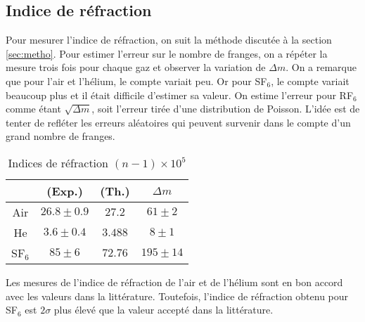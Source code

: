\documentclass[10pt,letterpaper,twocolumn]{article}
\newcommand{\s}{\hspace{0.1cm}}
\begin{document}
\subsection{Indice de réfraction}
Pour mesurer l'indice de réfraction, on suit la méthode discutée à la section \ref{sec:metho}. Pour estimer l'erreur sur le nombre de franges, on a répéter la mesure trois fois pour chaque gaz et observer la variation de $\Delta m$. On a remarque que pour l'air et l'hélium, le compte variait peu. Or pour SF$_6$, le compte variait beaucoup plus et il était difficile d'estimer sa valeur. On estime l'erreur pour RF$_6$ comme étant $\sqrt{\Delta m}$, soit l'erreur tirée d'une distribution de Poisson. L'idée est de tenter de refléter les erreurs aléatoires qui peuvent survenir dans le compte d'un grand nombre de franges. 
\begin{table}[H]
	\centering
	\caption{Indices de réfraction $(n - 1)\times 10^5$}
	\begin{tabular}{|c|c|c|c|}
		\hline
		  &  (Exp.) & (Th.)\supercite{rii} & $\Delta m$ \\\hline
		  Air & $26.8 \pm 0.9$ &   $27.2$  &   $61 \pm 2$   \\\hline
		  He &  $3.6 \pm 0.4$   &   $3.488$ &    $8 \pm 1$   \\\hline
		  SF$_6$  &  $85 \pm 6$ & $72.76$    &    $195 \pm 14$  \\\hline
	\end{tabular}
\end{table}
Les mesures de l'indice de réfraction de l'air et de l'hélium sont en bon accord avec les valeurs dans la littérature. Toutefois, l'indice de réfraction obtenu pour SF$_6$ est $2\sigma$ plus élevé que la valeur accepté dans la littérature. 
\end{document}
